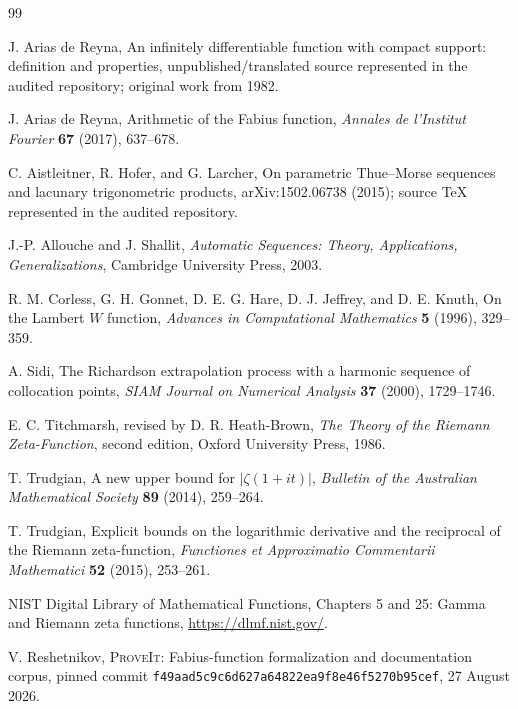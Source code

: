 \documentclass[11pt,oneside]{article}
\numberwithin{equation}{section}
\theoremstyle{definition}
\theoremstyle{remark}
\newcommand{\repo}{\textsc{ProveIt}}
\begin{document}
\begin{thebibliography}{99}

J. Arias de Reyna,
\newblock An infinitely differentiable function with compact support: definition and properties,
\newblock unpublished/translated source represented in the audited repository; original work from 1982.

J. Arias de Reyna,
\newblock Arithmetic of the Fabius function,
\newblock \emph{Annales de l'Institut Fourier} \textbf{67} (2017), 637--678.

C. Aistleitner, R. Hofer, and G. Larcher,
\newblock On parametric Thue--Morse sequences and lacunary trigonometric products,
\newblock arXiv:1502.06738 (2015); source TeX represented in the audited repository.

J.-P. Allouche and J. Shallit,
\newblock \emph{Automatic Sequences: Theory, Applications, Generalizations},
\newblock Cambridge University Press, 2003.

R. M. Corless, G. H. Gonnet, D. E. G. Hare, D. J. Jeffrey, and D. E. Knuth,
\newblock On the Lambert $W$ function,
\newblock \emph{Advances in Computational Mathematics} \textbf{5} (1996), 329--359.

A. Sidi,
\newblock The Richardson extrapolation process with a harmonic sequence of collocation points,
\newblock \emph{SIAM Journal on Numerical Analysis} \textbf{37} (2000), 1729--1746.

E. C. Titchmarsh, revised by D. R. Heath-Brown,
\newblock \emph{The Theory of the Riemann Zeta-Function}, second edition,
\newblock Oxford University Press, 1986.

T. Trudgian,
\newblock A new upper bound for $|\zeta(1+it)|$,
\newblock \emph{Bulletin of the Australian Mathematical Society} \textbf{89} (2014), 259--264.

T. Trudgian,
\newblock Explicit bounds on the logarithmic derivative and the reciprocal of the Riemann zeta-function,
\newblock \emph{Functiones et Approximatio Commentarii Mathematici} \textbf{52} (2015), 253--261.

NIST Digital Library of Mathematical Functions,
\newblock Chapters 5 and 25: Gamma and Riemann zeta functions,
\newblock \url{https://dlmf.nist.gov/}.

V. Reshetnikov,
\newblock \repo{}: Fabius-function formalization and documentation corpus,
\newblock pinned commit \texttt{f49aad5c9c6d627a64822ea9f8e46f5270b95cef}, 27 August 2026.

\end{thebibliography}
\end{document}
